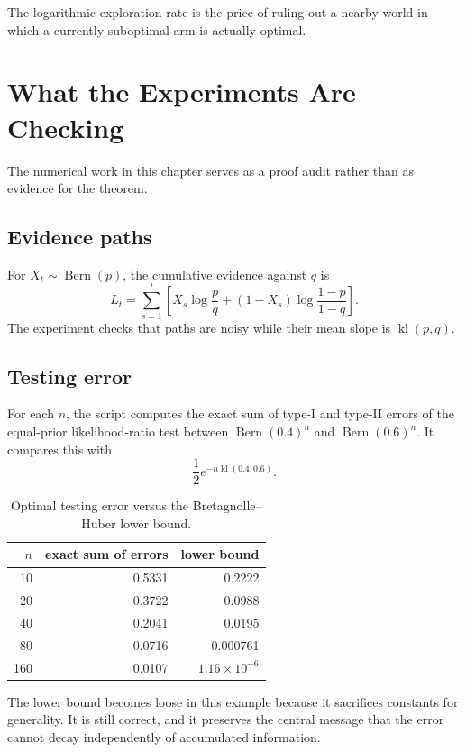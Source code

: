 \documentclass[en,nofont,11pt]{elegantbook}
\newcommand{\kl}{\operatorname{kl}}
\newcommand{\Ber}{\operatorname{Bern}}
\begin{document}
\begin{keyidea}
The logarithmic exploration rate is the price of ruling out a nearby world in which a currently suboptimal arm is actually optimal.
\end{keyidea}

\chapter{What the Experiments Are Checking}

The numerical work in this chapter serves as a proof audit rather than as evidence for the theorem.

\section{Evidence paths}

For $X_t\sim\Ber(p)$, the cumulative evidence against $q$ is
\[
L_t
=
\sum_{s=1}^{t}
\left[
X_s\log\frac{p}{q}
+(1-X_s)\log\frac{1-p}{1-q}
\right].
\]
The experiment checks that paths are noisy while their mean slope is $\kl(p,q)$.

\section{Testing error}

For each $n$, the script computes the exact sum of type-I and type-II errors of the equal-prior likelihood-ratio test between $\Ber(0.4)^n$ and $\Ber(0.6)^n$. It compares this with
\[
\frac12e^{-n\kl(0.4,0.6)}.
\]

\begin{table}[H]
\centering
\caption{Optimal testing error versus the Bretagnolle--Huber lower bound.}
\begin{tabular}{rrr}
\toprule
$n$ & exact sum of errors & lower bound \\
\midrule
10  & 0.5331 & 0.2222 \\
20  & 0.3722 & 0.0988 \\
40  & 0.2041 & 0.0195 \\
80  & 0.0716 & 0.000761 \\
160 & 0.0107 & $1.16\times10^{-6}$ \\
\bottomrule
\end{tabular}
\end{table}

The lower bound becomes loose in this example because it sacrifices constants for generality. It is still correct, and it preserves the central message that the error cannot decay independently of accumulated information.
\end{document}
